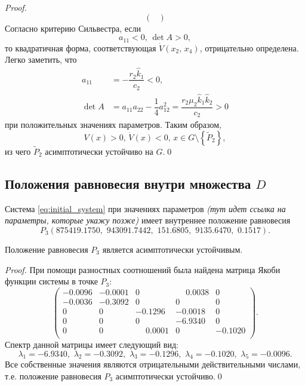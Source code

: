\documentclass[14pt,a4paper]{extarticle}
\begin{document}
\begin{proof}
\[\begin{pmatrix}
		\end{pmatrix}\]
		Согласно критерию Сильвестра, если 
		\[a_{11}<0,\, \det A>0,\]
		то квадратичная форма, соответствующая $\dot{V}(x_2,\, x_4)$, отрицательно определена. Легко заметить, что 
		\begin{align*}
			a_{11} &= -\dfrac{r_2\hat{k}_1}{c_2}<0,\\
			\det A &= a_{11}a_{22}-\dfrac{1}{4}a^2_{12} = \dfrac{r_2\mu_2\hat{k}_1\hat{k}_2}{c_2}>0
		\end{align*}
		при положительных значениях параметров. Таким образом, 
		\[V(x)>0,\, \dot{V}(x)<0,\, x\in G\setminus\left\{\tilde{P}_2\right\},\]
		из чего $\tilde{P}_2$ асимптотически устойчиво на $G$.\qed
	\end{proof}
	
	\subsection{Положения равновесия внутри множества $D$}
	
	\begin{theorem}
		Система \ref{eq:initial_system} при значениях параметров \textit{(тут идет ссылка на параметры, которые укажу позже)} имеет внутреннее положение равновесия
		\[P_3\left(875419.1750,\,\,943091.7442,\,\,151.6805,\,\,9135.6470,\,\,0.1517\right).\] 
	\end{theorem}
	
	\begin{theorem}
		Положение равновесия $P_3$ является асимптотически устойчивым. 
	\end{theorem}
	\begin{proof}
		При помощи разностных соотношений была найдена матрица Якоби функции системы в точке $P_3$: 
		\[\begin{pmatrix}
			-0.0096 & -0.0001 & 0 & \phantom{-}0.0038 & 0\\ 
			-0.0036 & -0.3092 & 0 & 0 & 0\\    
			0 & 0 & -0.1296 & -0.0018 & 0\\    
			0 & 0 & 0 & -6.9340 & 0\\   
			0 & 0 & \phantom{-}0.0001 & 0 & -0.1020\\ 
		\end{pmatrix}.\]
		Спектр данной матрицы имеет следующий вид:
		\[\lambda_1=-6.9340,\,\, \lambda_2=-0.3092,\,\, \lambda_3=-0.1296,\,\, \lambda_4=-0.1020,\,\, \lambda_5=-0.0096.\]
		Все собственные значения являются отрицательными действительными числами, т.е. положение равновесия $P_3$ асимптотически устойчиво.\qed
	\end{proof}
	
\end{document}
